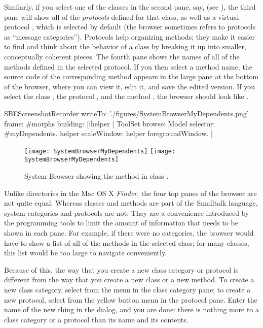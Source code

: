 \documentclass[a4paper,10pt,twoside]{book}
\begin{document}
Similarly, if you select one of the classes in the second pane, say,  (see ), the third pane will show all of the \emph{protocols} defined for that class, as well as a virtual protocol , which is selected by default (the browser sometimes refers to protocols as ``message categories'').
Protocols help organizing methods; they make it easier to find and think about the behavior of a class by breaking it up into smaller, conceptually coherent pieces.
The fourth pane shows the names of all of the methods defined in the selected protocol.
If you then select a method name, the source code of the corresponding method appears in the large pane at the bottom of the browser, where you can view it, edit it, and save the edited version.
If you select the class , the protocol , and the method , the browser should look like .

\begin{ExecuteSmalltalkScript}
SBEScreenshotRecorder writeTo: './figures/SystemBrowserMyDependents.png' frame: #morphs building: [:helper |
	ToolSet browse: Model selector: #myDependents.
	helper scaleWindow: helper foregroundWindow.
]
\end{ExecuteSmalltalkScript}
\begin{figure}[htbp]
   \centering
   \ifluluelse
	   {\texttt{[image: SystemBrowserMyDependents]}}
	   {\texttt{[image: SystemBrowserMyDependents]}}
   \caption{System Browser showing the  method in class .
   \label{fig:SystemBrowserMyDependents}}
\end{figure}

Unlike directories in the Mac OS X \emph{Finder}, the four top panes of the browser are not quite equal.
Whereas classes and methods are part of the Smalltalk language, system categories and protocols are not:
They are a convenience introduced by the programming tools to limit the amount of information that needs to be shown in each pane.
For example, if there were no categories, the browser would have to show a list of all of the methods in the selected class; for many classes, this list would be too large to navigate conveniently.

Because of this, the way that you create a new class category or protocol is different from the way that you create a new class or a new method.
To create a new class category, select  from the  menu in the class category pane; to create a new protocol, select  from the yellow button menu in the protocol pane.
Enter the name of the new thing in the dialog, and you are done: there is nothing more to a class category or a protocol than its name and its contents.
\end{document}
